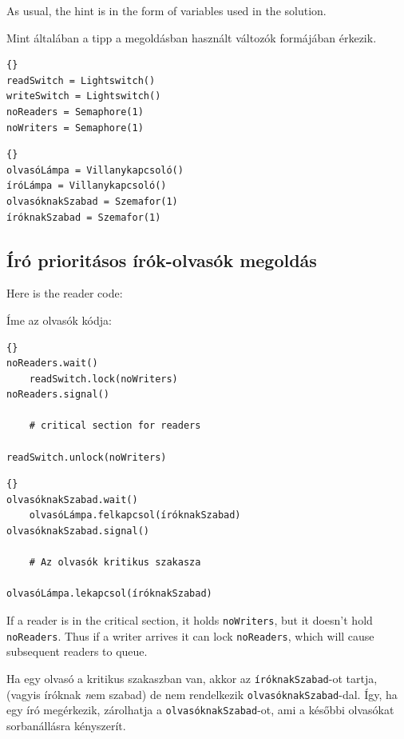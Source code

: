\documentclass{book}
\newcommand{\clearemptydoublepage}{\newpage\cleardoublepage}
\begin{document}
As usual, the hint is in the form of variables
used in the solution.

Mint általában a tipp a megoldásban használt változók formájában érkezik.

\begin{lstlisting}[title={Writer-priority readers-writers initialization}]{}
readSwitch = Lightswitch()
writeSwitch = Lightswitch()
noReaders = Semaphore(1)
noWriters = Semaphore(1)
\end{lstlisting}

\begin{lstlisting}[title={Író prioritásos írók-olvasók inicializáció}]{}
olvasóLámpa = Villanykapcsoló()
íróLámpa = Villanykapcsoló()
olvasóknakSzabad = Szemafor(1)
íróknakSzabad = Szemafor(1)
\end{lstlisting}


\clearemptydoublepage
\subsection{Író prioritásos írók-olvasók megoldás}

Here is the reader code:

Íme az olvasók kódja:

\begin{lstlisting}[title={Writer-priority reader solution}]{}
noReaders.wait()
    readSwitch.lock(noWriters)
noReaders.signal()

    # critical section for readers

readSwitch.unlock(noWriters)
\end{lstlisting}

\begin{lstlisting}[title={Író prioritásos olvasó megoldás}]{}
olvasóknakSzabad.wait()
    olvasóLámpa.felkapcsol(íróknakSzabad)
olvasóknakSzabad.signal()

    # Az olvasók kritikus szakasza

olvasóLámpa.lekapcsol(íróknakSzabad)
\end{lstlisting}

If a reader is in the critical section, it holds
{\tt noWriters}, but it doesn't hold {\tt noReaders}.
Thus if a writer arrives it can lock {\tt noReaders},
which will cause subsequent readers to queue.

Ha egy olvasó a kritikus szakaszban van, akkor az {\tt íróknakSzabad}-ot tartja,
(vagyis íróknak {\emph nem} szabad)
de nem rendelkezik {\tt olvasóknakSzabad}-dal. Így, ha egy író megérkezik,
zárolhatja a {\tt olvasóknakSzabad}-ot, ami a későbbi olvasókat sorbanállásra
kényszerít.
\end{document}
